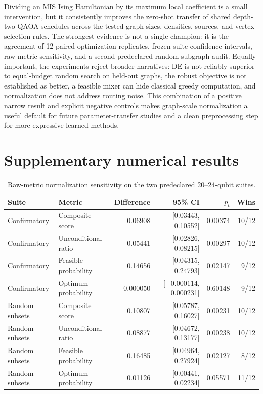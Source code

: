 \documentclass[10pt,twocolumn]{article}
\begin{document}
Dividing an MIS Ising Hamiltonian by its maximum local coefficient is a small intervention, but it consistently improves the zero-shot transfer of shared depth-two QAOA schedules across the tested graph sizes, densities, sources, and vertex-selection rules. The strongest evidence is not a single champion: it is the agreement of 12 paired optimization replicates, frozen-suite confidence intervals, raw-metric sensitivity, and a second predeclared random-subgraph audit. Equally important, the experiments reject broader narratives: DE is not reliably superior to equal-budget random search on held-out graphs, the robust objective is not established as better, a feasible mixer can hide classical greedy computation, and normalization does not address routing noise. This combination of a positive narrow result and explicit negative controls makes graph-scale normalization a useful default for future parameter-transfer studies and a clean preprocessing step for more expressive learned methods.




\clearpage
\onecolumn
\appendix
\section{Supplementary numerical results}

\begin{table}[h]
\centering
\caption{Raw-metric normalization sensitivity on the two predeclared 20--24-qubit suites.}
\small
\begin{tabular}{llrrrr}
\toprule
Suite & Metric & Difference & 95\% CI & $p_t$ & Wins \\
\midrule
Confirmatory & Composite score & 0.06908 & [0.03443, 0.10552] & 0.00374 & 10/12 \\
Confirmatory & Unconditional ratio & 0.05441 & [0.02826, 0.08215] & 0.00297 & 10/12 \\
Confirmatory & Feasible probability & 0.14656 & [0.04315, 0.24793] & 0.02147 & 9/12 \\
Confirmatory & Optimum probability & 0.000050 & [$-0.000114$, 0.000231] & 0.60148 & 9/12 \\
Random subsets & Composite score & 0.10807 & [0.05787, 0.16027] & 0.00231 & 10/12 \\
Random subsets & Unconditional ratio & 0.08877 & [0.04672, 0.13177] & 0.00238 & 10/12 \\
Random subsets & Feasible probability & 0.16485 & [0.04964, 0.27924] & 0.02127 & 8/12 \\
Random subsets & Optimum probability & 0.01126 & [0.00441, 0.02234] & 0.05571 & 11/12 \\
\bottomrule
\end{tabular}
\end{table}
\end{document}
